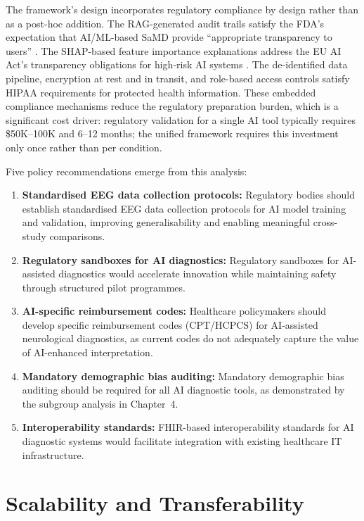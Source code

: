 The framework's design incorporates regulatory compliance by design rather than as a post-hoc addition. The RAG-generated audit trails satisfy the FDA's expectation that AI/ML-based SaMD provide ``appropriate transparency to users'' \cite{fda2021aiml}. The SHAP-based feature importance explanations address the EU AI Act's transparency obligations for high-risk AI systems \cite{eu2021aiact}. The de-identified data pipeline, encryption at rest and in transit, and role-based access controls satisfy HIPAA requirements for protected health information. These embedded compliance mechanisms reduce the regulatory preparation burden, which is a significant cost driver: regulatory validation for a single AI tool typically requires \$50K--100K and 6--12 months; the unified framework requires this investment only once rather than per condition.

Five policy recommendations emerge from this analysis:

\begin{enumerate}[leftmargin=*, itemsep=3pt]
    \item \textbf{Standardised EEG data collection protocols:} Regulatory bodies should establish standardised EEG data collection protocols for AI model training and validation, improving generalisability and enabling meaningful cross-study comparisons.
    \item \textbf{Regulatory sandboxes for AI diagnostics:} Regulatory sandboxes for AI-assisted diagnostics would accelerate innovation while maintaining safety through structured pilot programmes.
    \item \textbf{AI-specific reimbursement codes:} Healthcare policymakers should develop specific reimbursement codes (CPT/HCPCS) for AI-assisted neurological diagnostics, as current codes do not adequately capture the value of AI-enhanced interpretation.
    \item \textbf{Mandatory demographic bias auditing:} Mandatory demographic bias auditing should be required for all AI diagnostic tools, as demonstrated by the subgroup analysis in Chapter~4.
    \item \textbf{Interoperability standards:} FHIR-based interoperability standards for AI diagnostic systems would facilitate integration with existing healthcare IT infrastructure.
\end{enumerate}

\section{Scalability and Transferability}
\label{app_j:scalability}


